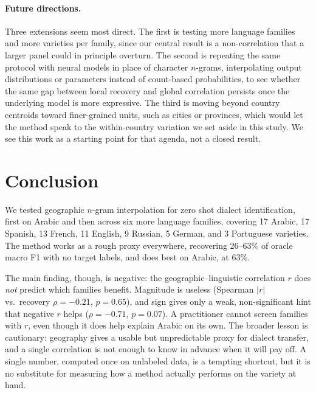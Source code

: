 \documentclass[11pt]{article}
\begin{document}
\paragraph{Future directions.}
Three extensions seem most direct.
The first is testing more language families and more varieties per family, since our central result is a non-correlation that a larger panel could in principle overturn.
The second is repeating the same protocol with neural models in place of character $n$-grams, interpolating output distributions or parameters instead of count-based probabilities, to see whether the same gap between local recovery and global correlation persists once the underlying model is more expressive.
The third is moving beyond country centroids toward finer-grained units, such as cities or provinces, which would let the method speak to the within-country variation we set aside in this study.
We see this work as a starting point for that agenda, not a closed result.

\section{Conclusion}
\label{sec:conclusion}

We tested geographic $n$-gram interpolation for zero shot dialect identification, first on Arabic and then across six more language families, covering 17 Arabic, 17 Spanish, 13 French, 11 English, 9 Russian, 5 German, and 3 Portuguese varieties.
The method works as a rough proxy everywhere, recovering 26--63\% of oracle macro F1 with no target labels, and does best on Arabic, at 63\%.

The main finding, though, is negative: the geographic--linguistic correlation $r$ does \emph{not} predict which families benefit.
Magnitude is useless (Spearman $|r|$ vs.\ recovery $\rho{=}{-}0.21$, $p{=}0.65$), and sign gives only a weak, non-significant hint that negative $r$ helps ($\rho{=}{-}0.71$, $p{=}0.07$).
A practitioner cannot screen families with $r$, even though it does help explain Arabic on its own.
The broader lesson is cautionary: geography gives a usable but unpredictable proxy for dialect transfer, and a single correlation is not enough to know in advance when it will pay off.
A single number, computed once on unlabeled data, is a tempting shortcut, but it is no substitute for measuring how a method actually performs on the variety at hand.



\end{document}
